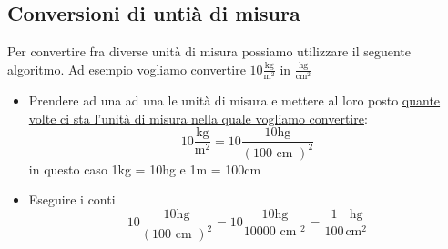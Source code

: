 \subsection{Conversioni di untià di misura}
Per convertire fra diverse unità di misura possiamo utilizzare il seguente algoritmo. Ad esempio vogliamo convertire $ 10 \frac{\text{kg}}{\text{m}^2 } $ in $ \frac{\text{hg}}{\text{cm}^2 } $
\begin{itemize}
	\item Prendere ad una ad una le unità di misura e mettere al loro posto \underline{quante volte ci sta l'unità di misura nella quale vogliamo convertire}:
	      \[
		      10 \frac{\text{kg}}{\text{m}^2 } = 10 \frac{10 \text{hg}}{\left(100 \text{ cm }\right)^2 }
	      \]
	      in questo caso 1kg = 10hg e 1m = 100cm
	\item Eseguire i conti
	      \[
		      10 \frac{10 \text{hg}}{\left(100 \text{ cm }\right)^2 } = 10 \frac{10 \text{hg}}{ 10000 \text{ cm }^2 } = \frac{1}{100} \frac{\text{hg}}{\text{cm}^2 }
	      \]
\end{itemize}
